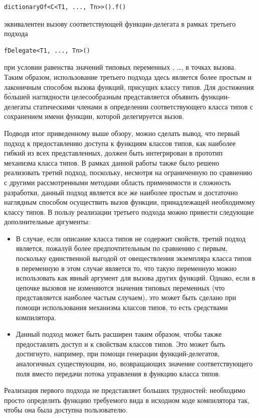 \begin{lstlisting}[style={wo_caption}]
dictionaryOf<C<T1, ..., Tn>>().f()
\end{lstlisting}
эквивалентен вызову соответствующей функции-делегата  в рамках третьего подхода  
\begin{lstlisting}[style={wo_caption}]
fDelegate<T1, ..., Tn>()
\end{lstlisting}
при условии равенства значений типовых переменных , \ldots,  в точках вызова. Таким образом, использование третьего подхода здесь является более простым и лаконичным способом вызова функций, присущих классу типов. Для достижения б\'{о}льшей наглядности целесообразным представляется объявить функции-делегаты статическими членами в определении соответствующего класса типов с сохранением имени функции, которой делегируется вызов. 

Подводя итог приведенному выше обзору, можно сделать вывод, что первый подход к предоставлению доступа к функциям классов типов, как наиболее гибкий из всех представленных, должен быть интегрирован в прототип механизма класса типов. В рамках данной работы также было решено реализовать третий подход, поскольку, несмотря на ограниченную по сравнению с другими рассмотренными методами область применимости и сложность разработки, данный подход является все же наиболее простым и достаточно наглядным способом осуществить вызов функции, принадлежащей необходимому классу типов. В пользу реализации третьего подхода можно привести следующие дополнительные аргументы:
\begin{itemize}
    \item В случае, если описание класса типов не содержит свойств, третий подход является, пожалуй более предпочтительным по сравнению с первым, поскольку единственной выгодой от овеществления экземпляра класса типов в переменную в этом случае является то, что такую переменную можно использовать как явный аргумент для вызова других функций. Однако, если в цепочке вызовов не изменяются значения типовых переменных (что представляется наиболее частым случаем), это может быть сделано при помощи использования механизма классов типов, то есть средствами компилятора. 
    \item Данный подход может быть расширен таким образом, чтобы также предоставлять доступ и к свойствам классов типов. Это может быть достигнуто, например, при помощи генерации функций-делегатов, аналогичных существующим, но, возвращающих значение соответствующего поля вместо передачи потока управления в функцию класса типов.   
\end{itemize}
Реализация первого подхода не представляет больших трудностей: необходимо просто определить функцию требуемого вида в исходном коде компилятора так, чтобы она была доступна пользователю. 

